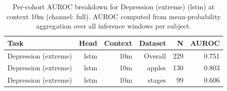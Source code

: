 \begin{table}[ht]
\centering
\caption{Per-cohort AUROC breakdown for Depression (extreme) (lstm) at context 10m (channel: full). AUROC computed from mean-probability aggregation over all inference windows per subject.}
\label{tab:cohort_depression_extreme_binary_lstm_full}
\begin{tabular}{lrrrrr}
\toprule
Task & Head & Context & Dataset & N & AUROC \\
\midrule
Depression (extreme) & lstm & 10m & Overall & 229 & 0.751 \\
Depression (extreme) & lstm & 10m & apples & 130 & 0.803 \\
Depression (extreme) & lstm & 10m & stages & 99 & 0.606 \\
\bottomrule
\end{tabular}
\end{table}
